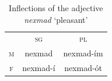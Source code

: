 {\begin{description}

   \begin{table}[t]
      \small
      \centering
       \setlength{\extrarowheight}{8pt}
      \begin{tabular}{ccc} 
 \toprule
 & \textsc{sg} & \textsc{pl} \\
\cmidrule{2-3}
    \textsc{m} & nexmad & nexmad-\'{i}m \\
   \textsc{f} &  nexmad-\'{i} & nexmad-\'{o}t \\
    \bottomrule
    \end{tabular}
    \label{tab:non-y-adjs}
    \caption{Inflections of the adjective \textit{nexmad} `pleasant'}
    \end{table}



\end{description}}
